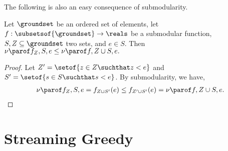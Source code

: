 \documentclass[oneside,letterpaper]{scrartcl} \usepackage{macros}
\begin{document}
The following is also an easy consequence of submodularity.
\begin{lemma}
  Let $\groundset$ be an ordered set of elements, let $f:
  \subsetsof{\groundset} \to \reals$ be a submodular function, $S,Z
  \subseteq \groundset$ two sets, and $e \in S$. Then
  \begin{math}
    \incvalueof{f_Z}{S}{e} \leq \incvalueof{f}{Z \cup S}{e}.
  \end{math}
  \begin{proof}
    Let $Z' = \setof{z \in Z \suchthat z < e}$ and $S' = \setof{s \in
      S \suchthat s < e}$. By submodularity, we have,
    \begin{align*}
      \incvalueof{f_Z}{S}{e} = f_{Z \cup S'}(e) \leq f_{Z' \cup S'}(e)
      = \incvalueof{f}{Z \cup S}{e}.
    \end{align*}
  \end{proof}
\end{lemma}
\FloatBarrier
\section{Streaming Greedy}

\newcommand{\finalset}{\tilde{S}}\newcommand{\setbefore}[1]{S_{#1}^-} \newcommand{\setafter}[1]{S_{#1}^+} \newcommand{\takens}{U}\newcommand{\taken}{u} \newcommand{\candidates}{C}
\newcommand{\candidatesfor}[1]{\candidates_{#1}}
\newcommand{\gain}{\delta} \newcommand{\gainof}[1]{\delta_{#1}} \newcommand{\deleted}{d} \newcommand{\deleteds}{\takens \setminus \finalset} 
\end{document}
